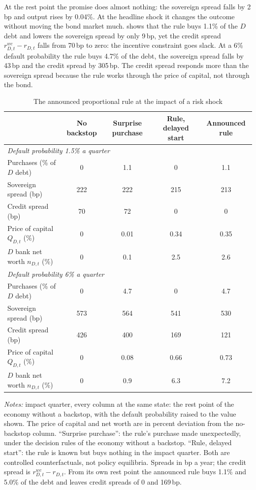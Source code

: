 At the rest point the promise does almost nothing: the sovereign spread falls by 2\,bp and
output rises by 0.04\%. At the headline shock it changes the outcome without moving the bond
market much.  shows that the rule buys 1.1\% of the $D$ debt and lowers
the sovereign spread by only 9\,bp, yet the credit spread $r^{wc}_{D,t}-r_{D,t}$ falls from
70\,bp to zero: the incentive constraint goes slack. At a 6\% default probability the rule buys
4.7\% of the debt, the sovereign spread falls by 43\,bp and the credit spread by 305\,bp. The
credit spread responds more than the sovereign spread because the rule works through the
price of capital, not through the bond.

\begin{table}[htbp]
\centering
\caption{The announced proportional rule at the impact of a risk shock}
\label{tab:proportional}
\begin{tabular}{lcccc}
\toprule
 & No backstop & Surprise purchase & Rule, delayed start & Announced rule \\
\midrule
\multicolumn{5}{l}{\emph{Default probability 1.5\% a quarter}} \\
Purchases (\% of $D$ debt) & 0 & 1.1 & 0 & 1.1 \\
Sovereign spread (bp) & 222 & 222 & 215 & 213 \\
Credit spread (bp) & 70 & 72 & 0 & 0 \\
Price of capital $Q_{D,t}$ (\%) & 0 & 0.01 & 0.34 & 0.35 \\
$D$ bank net worth $n_{D,t}$ (\%) & 0 & 0.1 & 2.5 & 2.6 \\
\midrule
\multicolumn{5}{l}{\emph{Default probability 6\% a quarter}} \\
Purchases (\% of $D$ debt) & 0 & 4.7 & 0 & 4.7 \\
Sovereign spread (bp) & 573 & 564 & 541 & 530 \\
Credit spread (bp) & 426 & 400 & 169 & 121 \\
Price of capital $Q_{D,t}$ (\%) & 0 & 0.08 & 0.66 & 0.73 \\
$D$ bank net worth $n_{D,t}$ (\%) & 0 & 0.9 & 6.3 & 7.2 \\
\bottomrule
\end{tabular}
\par\medskip
\begin{minipage}{0.92\linewidth}\footnotesize
\emph{Notes:} impact quarter, every column at the same state: the rest point of the economy
without a backstop, with the default probability raised to the value shown. The price of
capital and net worth are in percent deviation from the no-backstop column. ``Surprise
purchase'': the rule's purchase made unexpectedly, under the decision rules of the economy
without a backstop. ``Rule, delayed start'': the rule is known but buys nothing in the impact
quarter. Both are controlled counterfactuals, not policy equilibria. Spreads in bp a year;
the credit spread is $r^{wc}_{D,t}-r_{D,t}$. From its own rest point the announced rule buys
1.1\% and 5.0\% of the debt and leaves credit spreads of 0 and 169\,bp.
\end{minipage}
\end{table}

